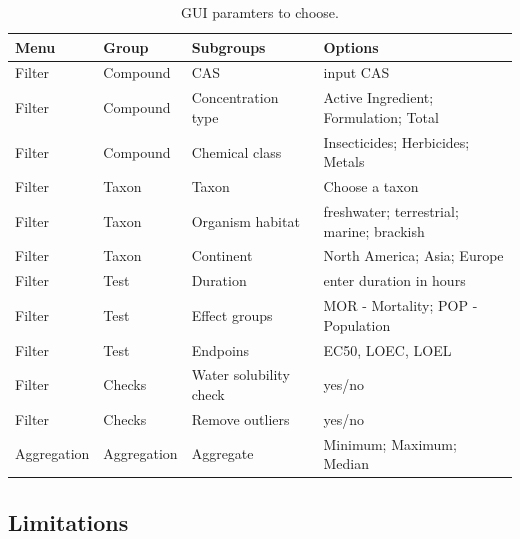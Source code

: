 \begin{table}[h!]
\begin{tabular}{|l|l|l|l|}
\hline
Menu   & Group       & Subgroups              & Options \\ \hline
Filter      & Compound    & CAS                    & input CAS \\ \hline
Filter      & Compound    & Concentration type     & Active Ingredient; Formulation; Total \\ \hline
Filter      & Compound    & Chemical class         & Insecticides; Herbicides; Metals \\ \hline
Filter      & Taxon       & Taxon                  & Choose a taxon \\ \hline
Filter      & Taxon       & Organism habitat       & freshwater; terrestrial; marine; brackish \\ \hline
Filter      & Taxon       & Continent              & North America; Asia; Europe \\ \hline
Filter      & Test        & Duration               & enter duration in hours \\ \hline
Filter      & Test        & Effect groups          & MOR - Mortality; POP - Population \\ \hline
Filter      & Test        & Endpoins               & EC50, LOEC, LOEL \\ \hline
Filter      & Checks      & Water solubility check & yes/no \\ \hline
Filter      & Checks      & Remove outliers        & yes/no \\ \hline
Aggregation & Aggregation & Aggregate              & Minimum; Maximum; Median \\ \hline
\end{tabular}
\caption{\etoxbase GUI paramters to choose.}
\label{tab:inputs}
\end{table}


\subsection*{Limitations}

